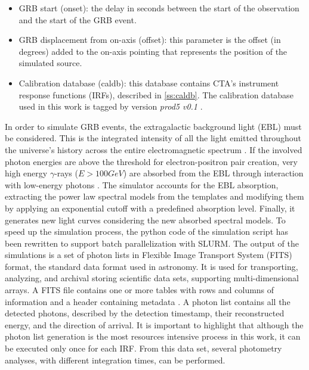 \begin{itemize}
    \item GRB start (onset): the delay in seconds between the start of the observation and the start of the GRB event.
    \item GRB displacement from on-axis (offset): this parameter is the offset (in degrees) added to the on-axis pointing that represents the position of the simulated source.
    \item Calibration database (caldb): this database contains CTA's instrument response functions (IRFs), described in \autoref{ss:caldb}. The calibration database used in this work is tagged by version \textit{prod5 v0.1} \cite{zenodo_2021}.
\end{itemize}
In order to simulate GRB events, the extragalactic background light (EBL) must be considered. This is the integrated intensity of all the light emitted throughout the universe's history across the entire electromagnetic spectrum \cite{Cooray_2016}. 
If the involved photon energies are above the threshold for electron-positron pair creation, very high energy $\gamma$-rays ($E >100 GeV$) are absorbed from the EBL through interaction with low-energy photons \cite{Mazin_2013}. The simulator \cite{dipiano2022ctasagsci} accounts for the EBL absorption, extracting the power law spectral models from the templates and modifying them by applying an exponential cutoff with a predefined absorption level. Finally, it generates new light curves considering the new absorbed spectral models. 
To speed up the simulation process, the python code of the simulation script has been rewritten to support batch parallelization with SLURM. The output of the simulations is a set of photon lists in Flexible Image Transport System (FITS) format, the standard data format used in astronomy. It is used for transporting, analyzing, and archival storing scientific data sets, supporting multi-dimensional arrays. A FITS file contains one or more tables with rows and columns of information and a header containing metadata \cite{fitswebsite}. A photon list contains all the detected photons, described by the detection timestamp, their reconstructed energy, and the direction of arrival.
It is important to highlight that although the photon list generation is the most resources intensive process in this work, it can be executed only once for each IRF. From this data set, several photometry analyses, with different integration times, can be performed.

